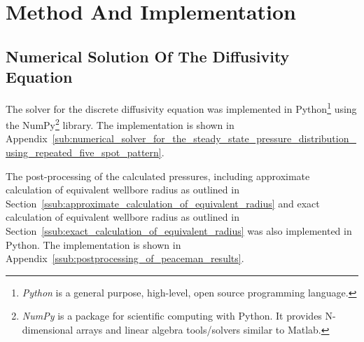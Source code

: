 
\section{Method And Implementation} %
\label{sec:method}

\subsection{Numerical Solution Of The Diffusivity Equation} %
\label{sub:numerical_solution_of_the_diffusivity_equation}
The solver for the discrete diffusivity equation was implemented in Python\footnote{\emph{Python} is a general purpose, high-level, open source programming language.} using the NumPy\footnote{\emph{NumPy} is a package for scientific computing with Python. It provides N-dimensional arrays and linear algebra tools/solvers similar to Matlab.} library. The implementation is shown in Appendix~\ref{sub:numerical_solver_for_the_steady_state_pressure_distribution_using_repeated_five_spot_pattern}.

The post-processing of the calculated pressures, including approximate calculation of equivalent wellbore radius as outlined in Section~\ref{ssub:approximate_calculation_of_equivalent_radius} and exact calculation of equivalent wellbore radius as outlined in Section~\ref{ssub:exact_calculation_of_equivalent_radius} was also implemented in Python. The implementation is shown in Appendix~\ref{ssub:postprocessing_of_peaceman_results}.


